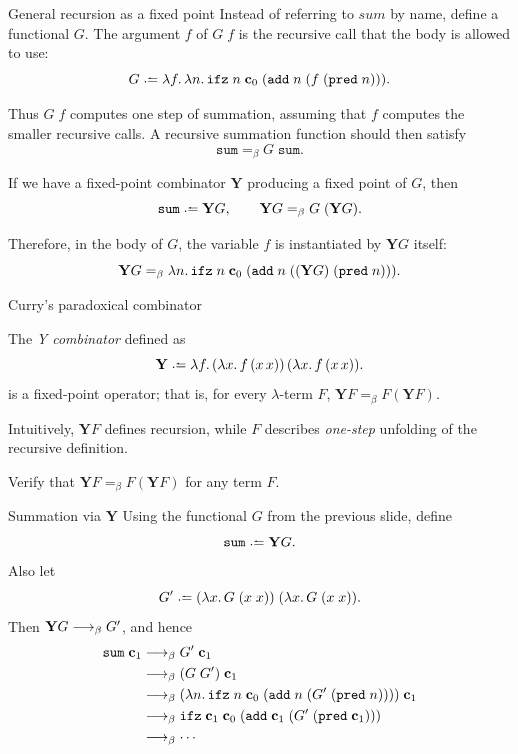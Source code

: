 \begin{frame}{General recursion as a fixed point}
  Instead of referring to $\mathit{sum}$ by name, define a functional $G$.
  The argument $f$ of $G\;f$ is the recursive call that the body is allowed
  to use:
  \[
    G \defeq
    \lambda f.\,
      \lambda n.\,
        \ifz\;n\;\bc_0\;
          (\add\;n\;(f\;(\pred\;n))).
  \]

  Thus $G\;f$ computes one step of summation, assuming that $f$ computes the smaller recursive calls.
  A recursive summation function should then satisfy
  \[
    \mathtt{sum} =_\beta G\;\mathtt{sum}.
  \]

  If we have a fixed-point combinator $\mathbf{Y}$ producing a fixed point of $G$, then
  \[
    \mathtt{sum} \defeq \mathbf{Y}G,
    \qquad
    \mathbf{Y}G =_\beta G\;(\mathbf{Y}G).
  \]

  Therefore, in the body of $G$, the variable $f$ is instantiated by
  $\mathbf{Y}G$ itself:
  \[
    \mathbf{Y}G
    =_\beta
    \lambda n.\,
      \mathtt{ifz}\;n\;\mathbf{c}_0\;
        (\mathtt{add}\;n\;((\mathbf{Y}G)\;(\mathtt{pred}\;n))).
  \]
\end{frame}

\begin{frame}{Curry's paradoxical combinator}

  \begin{proposition}

    The \emph{Y combinator} defined as
    \[
      \mathbf{Y} \defeq \lambda f.\,
        (\lambda x.\, f\,(x\,x))\,(\lambda x.\,f\,(x\,x)).
    \]
    is a fixed-point operator; that is, for every
    $\lambda$-term $F$, $\mathbf{Y}F =_\beta F(\mathbf{Y}F)$.
  \end{proposition}
  Intuitively, $\mathbf{Y}F$ defines recursion, while $F$ describes \emph{one-step} unfolding of
  the recursive definition.
  \vfil

  \begin{exercise*}
    Verify that $\mathbf{Y}F =_\beta F(\mathbf{Y}F)$ for any term $F$.
  \end{exercise*}
\end{frame}

\begin{frame}{Summation via $\mathbf{Y}$}
  Using the functional $G$ from the previous slide, define
  \[
    \mathtt{sum} \defeq \mathbf{Y}G.
  \]
  \medskip
  Also let
  \[
    G' \defeq
    (\lambda x.\,G\;(x\;x))\;(\lambda x.\,G\;(x\;x)).
  \]
  Then $\mathbf{Y}G \longrightarrow_{\beta} G'$, and hence
  \begin{align*}
    \mathtt{sum}\;\mathbf{c}_1
      &\longrightarrow_{\beta} G'\;\mathbf{c}_1 \\
      &\longrightarrow_{\beta} (G\;G')\;\mathbf{c}_1 \\
      &\longrightarrow_{\beta}
        (\lambda n.\,\mathtt{ifz}\;n\;\mathbf{c}_0\;
        (\mathtt{add}\;n\;(G'\;(\mathtt{pred}\;n))))\;\mathbf{c}_1 \\
      &\longrightarrow_{\beta}
        \mathtt{ifz}\;\mathbf{c}_1\;\mathbf{c}_0\;
        (\mathtt{add}\;\mathbf{c}_1\;(G'\;(\mathtt{pred}\;\mathbf{c}_1))) \\
      &\longrightarrow_{\beta} \cdots
  \end{align*}
\end{frame}

